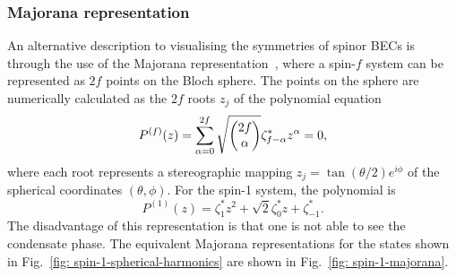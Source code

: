 \subsubsection{Majorana representation}
An alternative description to visualising the symmetries of spinor BECs is
through the use of the Majorana representation~\cite{Majorana1932,Bloch1945},
where a spin-\(f\) system can be represented as \(2f\) points on the Bloch
sphere.
The points on the sphere are numerically calculated as the \(2f\) roots
\(z_j\) of the polynomial equation
\begin{equation}
    P^{(f)}(z) = \sum_{\alpha = 0}^{2f}
    \sqrt{\mqty(2f \\ \alpha)}\zeta_{f-\alpha}^*z^\alpha=0,
\end{equation}
where each root represents a stereographic mapping
\(z_j=\tan(\theta/2)e^{i\phi}\) of the spherical coordinates \((\theta, \phi)\).
For the spin-1 system, the polynomial is
\begin{equation}
    P^{(1)}(z) = \zeta_1^*z^2+\sqrt{2}\zeta_0^*z+\zeta_{-1}^*.
\end{equation}
The disadvantage of this representation is that one is not able to see the
condensate phase.
The equivalent Majorana representations for the states shown in
Fig.~\ref{fig: spin-1-spherical-harmonics} are shown in
Fig.~\ref{fig: spin-1-majorana}.
